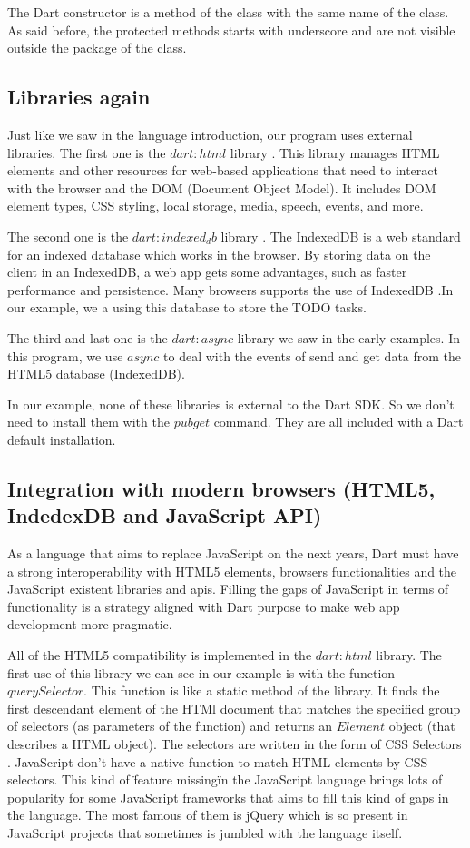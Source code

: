 The Dart constructor is a method of the class with the same name of the class.
As said before, the protected methods starts with underscore and are not visible
outside the package of the class.

\subsection{Libraries again}

Just like we saw in the language introduction, our program uses external
libraries. The first one is the $dart:html$
library \cite{4_3}. This library manages HTML
elements and other resources for web-based applications that need to interact
with the browser and the DOM (Document Object Model). It includes DOM element
types, CSS styling, local storage, media, speech, events, and more.

The second one is the $dart:indexed_db$
library \cite{4_4}. The IndexedDB is a web
standard for an indexed database which works in the browser. By storing data on
the client in an IndexedDB, a web app gets some advantages, such as faster
performance and persistence. Many browsers supports the use of
IndexedDB \cite{4_5}.In our example, we a using
this database to store the TODO tasks.

The third and last one is the $dart:async$
library \cite{4_6} we saw in the early
examples. In this program, we use $async$ to deal with the events of send
and get data from the HTML5 database (IndexedDB).

In our example, none of these libraries is external to the Dart SDK. So we don't
need to install them with the $pub get$ command. They are all included with a
Dart default installation.

\subsection{Integration with modern browsers (HTML5, IndedexDB and JavaScript API)}

As a language that aims to replace JavaScript on the next years, Dart must have
a strong interoperability with HTML5 elements, browsers functionalities and the
JavaScript existent libraries and apis. Filling the gaps of JavaScript in terms
of functionality is a strategy aligned with Dart purpose to make web app
development more pragmatic.

All of the HTML5 compatibility is implemented in the $dart:html$ library. The
first use of this library we can see in our example is with the function
$querySelector$. This function is like a static method of the library. It finds
the first descendant element of the HTMl document that matches the specified
group of selectors (as parameters of the function) and returns an $Element$
object (that describes a HTML object). The selectors are written in the
form of CSS Selectors \cite{4_7}. JavaScript don't
have a native function to match HTML elements by CSS selectors. This kind of
\"feature missing\" in the JavaScript language brings lots of popularity for some
JavaScript frameworks that aims to fill this kind of gaps in the language. The
most famous of them is jQuery \cite{4_8}
which is so present in JavaScript projects that sometimes is jumbled with the
language itself.

